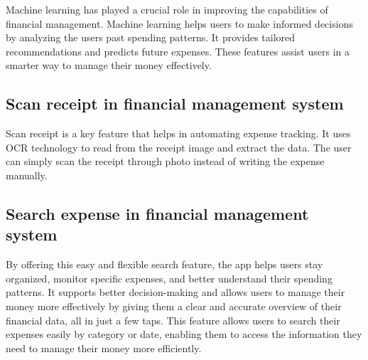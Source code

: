 \documentclass[12pt]{article}
\begin{document}
\vspace{0.5cm}

\noindent
\normalsize Machine learning has played a crucial role in improving the capabilities of financial management. Machine learning helps users to make informed decisions by analyzing the users past spending patterns. It provides tailored recommendations and predicts future expenses. These features assist users in a smarter way to manage their money effectively.

\vspace{1cm} %

\noindent
\subsection{Scan receipt in financial management system}

\vspace{0.5cm}

\noindent
\normalsize Scan receipt is a key feature that helps in automating expense tracking. It uses OCR technology to read from the receipt image and extract the data. The user can simply scan the receipt through photo instead of writing the expense manually.



\vspace{1cm} %
\noindent
\subsection{Search expense in financial management system}

\vspace{0.5cm}

\noindent
\normalsize By offering this easy and flexible search feature, the app helps users stay organized, monitor specific expenses, and better understand their spending patterns. It supports better decision-making and allows users to manage their money more effectively by giving them a clear and accurate overview of their financial data, all in just a few taps. This feature allows users to search their expenses easily by category or date, enabling them to access the information they need to manage their money more efficiently.

\vspace{1cm} %
\end{document}
